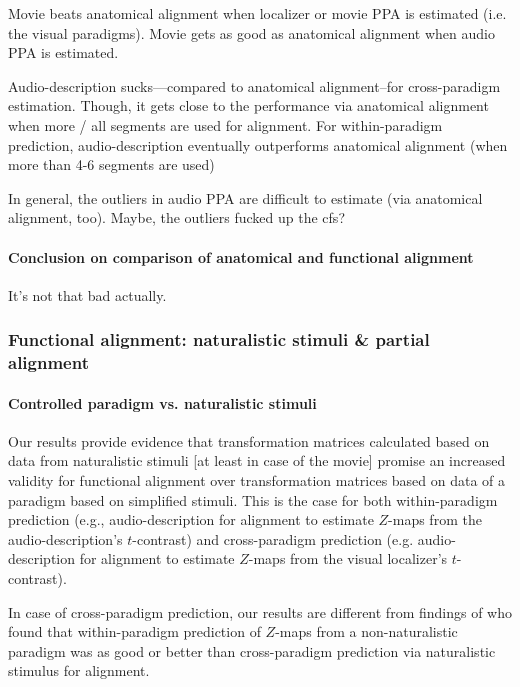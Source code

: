 %
Movie beats anatomical alignment when localizer or movie PPA is estimated (i.e.
the visual paradigms).
%
Movie gets as good as anatomical alignment when audio PPA is estimated.

%
Audio-description sucks---compared to anatomical alignment--for cross-paradigm
estimation.
%
Though, it gets close to the performance via anatomical alignment when more /
all segments are used for alignment.
%
For within-paradigm prediction, audio-description eventually outperforms
anatomical alignment (when more than 4-6 segments are used)
%

%
In general, the outliers in audio PPA are difficult to estimate (via anatomical
alignment, too).
%
Maybe, the outliers fucked up the \ac{cfs}?


\paragraph{Conclusion on comparison of anatomical and functional alignment}

It's not that bad actually.


\subsubsection{Functional alignment: naturalistic stimuli \& partial alignment}



\paragraph{Controlled paradigm vs. naturalistic stimuli}
%
Our results provide evidence that transformation matrices calculated based on
data from naturalistic stimuli [at least in case of the movie] promise an
increased validity for functional alignment over transformation matrices based
on data of a paradigm based on simplified stimuli.
%
This is the case for both within-paradigm prediction (e.g., audio-description
for alignment to estimate $Z$-maps from the audio-description's $t$-contrast)
and cross-paradigm prediction (e.g. audio-description for alignment to estimate
$Z$-maps from the visual localizer's $t$-contrast).

%
In case of cross-paradigm prediction, our results are different from findings of
\citet{haxby2011common} who found that within-paradigm prediction of $Z$-maps
from a non-naturalistic paradigm was as good or better than cross-paradigm
prediction via naturalistic stimulus for alignment.

